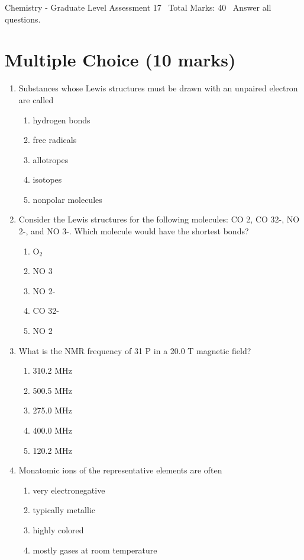 \documentclass[12pt]{article}
\begin{document}
\begin{center}
Chemistry - Graduate Level Assessment 17 \
Total Marks: 40 \
Answer all questions.
\end{center}

\section*{Multiple Choice (10 marks)}
\begin{enumerate}[label=\arabic*.]
\item Substances whose Lewis structures must be drawn with an unpaired electron are called
\begin{enumerate}[label=(\alph*)]
    \item hydrogen bonds
    \item free radicals
    \item allotropes
    \item isotopes
    \item nonpolar molecules
\end{enumerate}
\item Consider the Lewis structures for the following molecules: CO 2, CO 32-, NO 2-, and NO 3-. Which molecule would have the shortest bonds?
\begin{enumerate}[label=(\alph*)]
    \item O$_{2}$
    \item NO 3
    \item NO 2-
    \item CO 32-
    \item NO 2
\end{enumerate}
\item What is the NMR frequency of 31 P in a 20.0 T magnetic field?
\begin{enumerate}[label=(\alph*)]
    \item 310.2 MHz
    \item 500.5 MHz
    \item 275.0 MHz
    \item 400.0 MHz
    \item 120.2 MHz
\end{enumerate}
\item Monatomic ions of the representative elements are often
\begin{enumerate}[label=(\alph*)]
    \item very electronegative
    \item typically metallic
    \item highly colored
    \item mostly gases at room temperature

\end{enumerate}
\end{enumerate}
\end{document}
